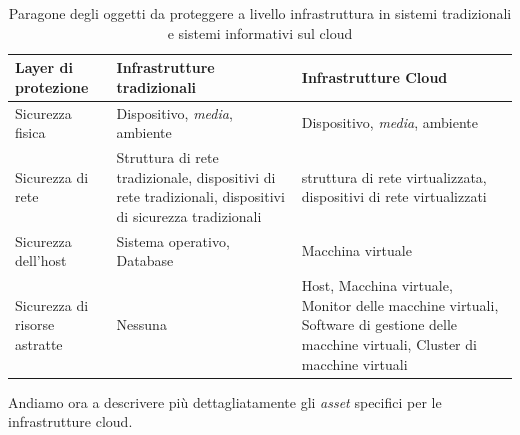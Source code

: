 \documentclass[../main.tex]{subfiles}
\begin{document}
\begin{table}[h]
\centering
\begin{tabular}{| m{2cm}| m{5.6cm} | m{5.6cm} | }
\hline
\textbf{Layer di protezione} & \textbf{Infrastrutture tradizionali} & \textbf{Infrastrutture Cloud} \\ \hline

Sicurezza fisica & Dispositivo, \textit{media}, ambiente & Dispositivo, \textit{media}, ambiente \\ \hline

Sicurezza di rete & Struttura di rete tradizionale, dispositivi di rete tradizionali, dispositivi di sicurezza tradizionali & struttura di rete virtualizzata, dispositivi di rete virtualizzati \\ \hline

Sicurezza dell'host & Sistema operativo, Database & Macchina virtuale \\ \hline

Sicurezza di risorse astratte & Nessuna & Host, Macchina virtuale, Monitor delle macchine virtuali, Software di gestione delle macchine virtuali, Cluster di macchine virtuali \\  \hline

\end{tabular}
\caption{Paragone degli oggetti da proteggere a livello infrastruttura in sistemi tradizionali e sistemi informativi sul cloud \cite{CSAssessmentSystemCG}}
\label{tab:cloud_security_assessment_tab_infr}
\end{table}

Andiamo ora a descrivere più dettagliatamente gli \textit{asset} specifici per le infrastrutture cloud.
\end{document}
